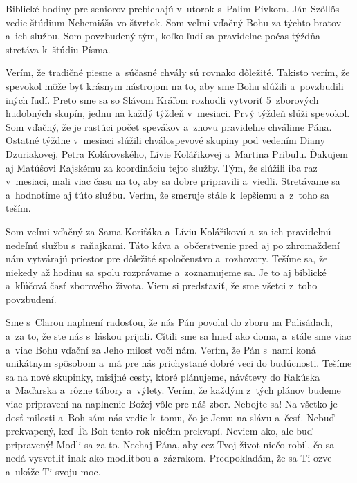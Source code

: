Biblické hodiny pre seniorov prebiehajú v~utorok s~Palim Pivkom. Ján Szőllős vedie štúdium Nehemiáša vo štvrtok. Som veľmi vďačný Bohu za týchto bratov a~ich službu. Som povzbudený tým, koľko ľudí sa pravidelne počas týždňa stretáva k~štúdiu Písma.


Verím, že tradičné piesne a~súčasné chvály sú rovnako dôležité. Takisto verím, že spevokol môže byť krásnym nástrojom na to, aby sme Bohu slúžili a~povzbudili iných ľudí. Preto sme sa so Slávom Kráľom rozhodli vytvoriť 5~zborových hudobných skupín, jednu na každý týždeň v~mesiaci. Prvý týždeň slúži spevokol. Som vďačný, že je rastúci počet spevákov a~znovu pravidelne chválime Pána. Ostatné týždne v~mesiaci slúžili chválospevové skupiny pod vedením Diany Dzuriakovej, Petra Kolárovského, Lívie Kolářikovej a~Martina Pribulu. Ďakujem aj Matúšovi Rajskému za koordináciu tejto služby.  Tým, že slúžili iba raz v~mesiaci, mali viac času na to, aby sa dobre pripravili a~viedli. Stretávame sa a~hodnotíme aj túto službu. Verím, že smeruje stále k~lepšiemu a~z~toho sa teším.


Som veľmi vďačný za Sama Koriťáka a~Líviu Kolářikovú a~za ich pravidelnú nedeľnú službu s~raňajkami. Táto káva a~občerstvenie pred aj po zhromaždení nám vytvárajú priestor pre dôležité spoločenstvo a~rozhovory. Tešíme sa, že niekedy až hodinu sa spolu rozprávame a~zoznamujeme sa. Je to aj biblické a~kľúčová časť zborového života. Viem si predstaviť, že sme všetci z~toho povzbudení.


Sme s~Clarou naplnení radosťou, že nás Pán povolal do zboru na Palisádach, a~za to, že ste nás s~láskou prijali. Cítili sme sa hneď ako doma, a~stále sme viac a~viac Bohu vďační za Jeho milosť voči nám. Verím, že Pán s~nami koná unikátnym spôsobom a~má pre nás prichystané dobré veci do budúcnosti. Tešíme sa na nové skupinky, misijné cesty, ktoré plánujeme, návštevy do Rakúska a~Maďarska a~rôzne tábory a~výlety. Verím, že každým z~tých plánov budeme viac pripravení na naplnenie Božej vôle pre náš zbor. Nebojte sa! Na všetko je dosť milosti a~Boh sám nás vedie k~tomu, čo je Jemu na slávu a~česť.  Nebuď prekvapený, keď Ťa Boh tento rok niečím prekvapí. Neviem ako, ale buď pripravený! Modli sa za to. Nechaj  Pána, aby cez Tvoj život niečo robil, čo sa nedá vysvetliť inak ako modlitbou a~zázrakom. Predpokladám, že sa Ti ozve a~ukáže Ti svoju moc.

